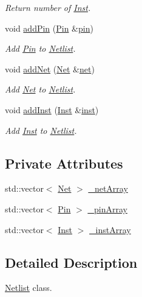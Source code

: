 \begin{DoxyCompactItemize}
\begin{DoxyCompactList}\small\item\em Return number of \hyperlink{classInst}{Inst}. \end{DoxyCompactList}\item 
void \hyperlink{classNetlist_af0e34bf0cae6f4dd74e4e553c9e7ca1c}{add\+Pin} (\hyperlink{classPin}{Pin} \&\hyperlink{classNetlist_a0aac5b79ca1a820f0adc7b79f1b0520d}{pin})
\begin{DoxyCompactList}\small\item\em Add \hyperlink{classPin}{Pin} to \hyperlink{classNetlist}{Netlist}. \end{DoxyCompactList}\item 
void \hyperlink{classNetlist_ab26277ae8a5f0ef605709c27e63c5492}{add\+Net} (\hyperlink{classNet}{Net} \&\hyperlink{classNetlist_a066ebef33fd139a25a50af1a144a8361}{net})
\begin{DoxyCompactList}\small\item\em Add \hyperlink{classNet}{Net} to \hyperlink{classNetlist}{Netlist}. \end{DoxyCompactList}\item 
void \hyperlink{classNetlist_a9214addbaff42dc7041509529d0ccb3c}{add\+Inst} (\hyperlink{classInst}{Inst} \&\hyperlink{classNetlist_a0670a50d2a63b33b1fb72c7b0d352c11}{inst})
\begin{DoxyCompactList}\small\item\em Add \hyperlink{classInst}{Inst} to \hyperlink{classNetlist}{Netlist}. \end{DoxyCompactList}\end{DoxyCompactItemize}
\subsection*{Private Attributes}
\begin{DoxyCompactItemize}
\item 
std\+::vector$<$ \hyperlink{classNet}{Net} $>$ \hyperlink{classNetlist_a88ad89f8acc15d2971b0689adaad8704}{\+\_\+net\+Array}
\item 
std\+::vector$<$ \hyperlink{classPin}{Pin} $>$ \hyperlink{classNetlist_a918185a2ba92067c416408dfc9d8fab2}{\+\_\+pin\+Array}
\item 
std\+::vector$<$ \hyperlink{classInst}{Inst} $>$ \hyperlink{classNetlist_a301a0c44a335af1bc3af743f645eae9e}{\+\_\+inst\+Array}
\end{DoxyCompactItemize}


\subsection{Detailed Description}
\hyperlink{classNetlist}{Netlist} class. 

